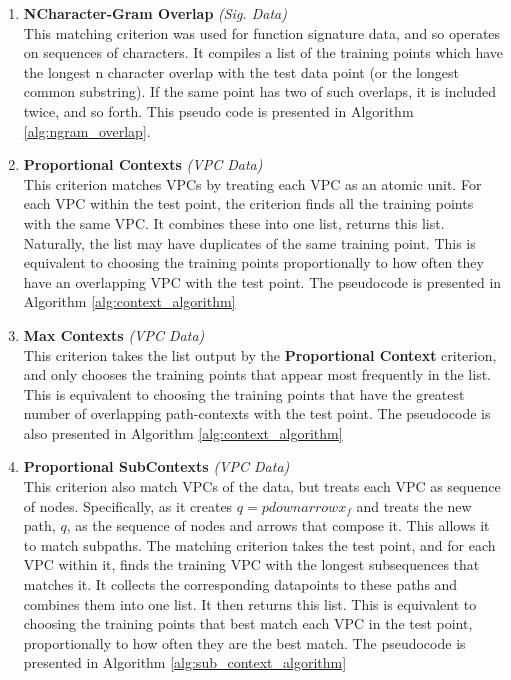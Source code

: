 \begin{enumerate}
    \item \textbf{NCharacter-Gram Overlap} \textit{(Sig. Data)} \\This matching criterion was used for function signature data, and so operates on sequences of characters. It compiles a list of the training points which have the longest n character overlap with the test data point (or the longest common substring). If the same point has two of such overlaps, it is included twice, and so forth. This pseudo code is presented in Algorithm \ref{alg:ngram_overlap}.
    \item \textbf{Proportional Contexts} \textit{(VPC Data)}\\This criterion matches VPCs by treating each VPC as an atomic unit. For each VPC within the test point, the criterion finds all the training points with the same VPC. It combines these into one list, returns this list. Naturally, the list may have duplicates of the same training point. This is equivalent to choosing the training points proportionally to how often they have an overlapping VPC with the test point. The pseudocode is presented in Algorithm \ref{alg:context_algorithm} 
    \item \textbf{Max Contexts} \textit{(VPC Data)}\\This criterion takes the list output by the \textbf{Proportional Context} criterion, and only chooses the training points that appear most frequently in the list. This is equivalent to choosing the training points that have the greatest number of overlapping path-contexts with the test point. The pseudocode is also presented in Algorithm \ref{alg:context_algorithm} 
    \item \textbf{Proportional SubContexts} \textit{(VPC Data)}\\This criterion also match VPCs of the data, but treats each VPC as sequence of nodes. Specifically, as it creates $q = p{downarrow}x_f$ and treats the new path, $q$, as the sequence of nodes and arrows that compose it. This allows it to match subpaths. The matching criterion takes the test point, and for each VPC within it, finds the training VPC with the longest subsequences that matches it. It collects the corresponding datapoints to these paths and combines them into one list. It then returns this list. This is equivalent to choosing the training points that best match each VPC in the test point, proportionally to how often they are the best match. The pseudocode is presented in Algorithm \ref{alg:sub_context_algorithm} 

\end{enumerate}
